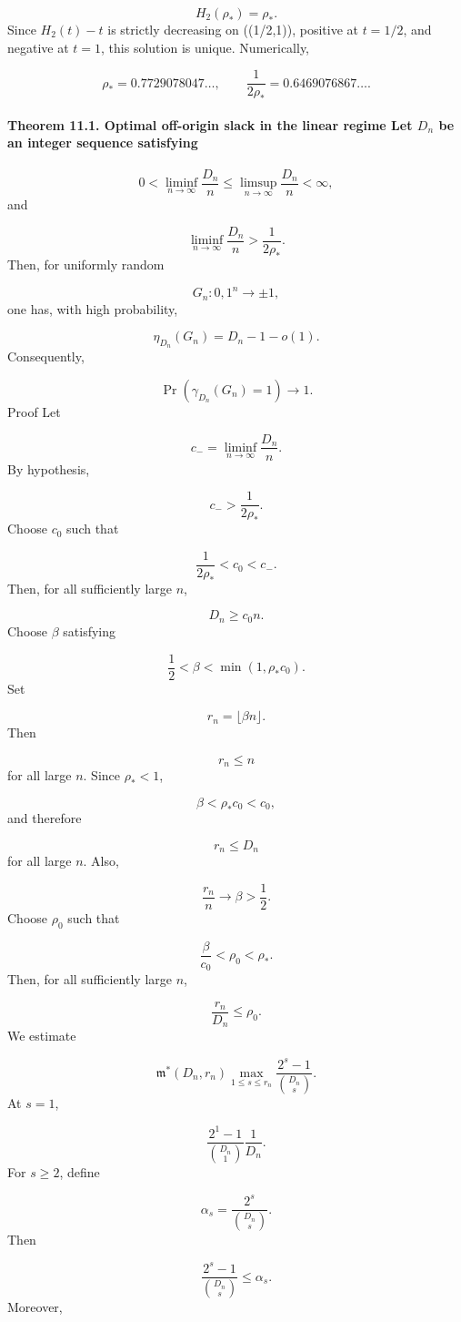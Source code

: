 \documentclass[11pt]{article}
\theoremstyle{definition}
\begin{document}
\[
H_2(\rho_*)=\rho_*.
\]
Since $H_2(t)-t$ is strictly decreasing on ((1/2,1)), positive at $t=1/2$, and negative at $t=1$, this solution is unique. Numerically,

\[
\rho_*=0.7729078047\ldots,
\qquad
\frac1{2\rho_*}=0.6469076867\ldots.
\]
\paragraph{Theorem 11.1. Optimal off-origin slack in the linear regime Let $D_n$ be an integer sequence satisfying}
\[
0<\liminf_{n\to\infty}\frac{D_n}{n}
\le
\limsup_{n\to\infty}\frac{D_n}{n}
<\infty,
\]
and

\[
\liminf_{n\to\infty}\frac{D_n}{n}>
\frac1{2\rho_*}.
\]
Then, for uniformly random

\[
G_n:{0,1}^n\to{\pm1},
\]
one has, with high probability,

\[
\eta_{D_n}(G_n)=D_n-1-o(1).
\]
Consequently,

\[
\Pr(\gamma_{D_n}(G_n)=1)\to1.
\]
Proof Let

\[
c_-=\liminf_{n\to\infty}\frac{D_n}{n}.
\]
By hypothesis,

\[
c_->\frac1{2\rho_*}.
\]
Choose $c_0$ such that

\[
\frac1{2\rho_*}<c_0<c_-.
\]
Then, for all sufficiently large $n$,

\[
D_n\ge c_0 n.
\]
Choose $\beta$ satisfying

\[
\frac12<\beta<\min(1,\rho_*c_0).
\]
Set

\[
r_n=\lfloor\beta n\rfloor.
\]
Then

\[
r_n\le n
\]
for all large $n$. Since $\rho_*<1$,

\[
\beta<\rho_*c_0<c_0,
\]
and therefore

\[
r_n\le D_n
\]
for all large $n$. Also,

\[
\frac{r_n}{n}\to\beta>\frac12.
\]
Choose $\rho_0$ such that

\[
\frac{\beta}{c_0}<\rho_0<\rho_*.
\]
Then, for all sufficiently large $n$,

\[
\frac{r_n}{D_n}\le \rho_0.
\]
We estimate

\[
\mathfrak m^*(D_n,r_n)
\max_{1\le s\le r_n}
\frac{2^s-1}{\binom{D_n}{s}}.
\]
At $s=1$,

\[
\frac{2^1-1}{\binom{D_n}{1}}
\frac1{D_n}.
\]
For $s\ge2$, define

\[
\alpha_s=\frac{2^s}{\binom{D_n}{s}}.
\]
Then

\[
\frac{2^s-1}{\binom{D_n}{s}}\le \alpha_s.
\]
Moreover,
\end{document}
